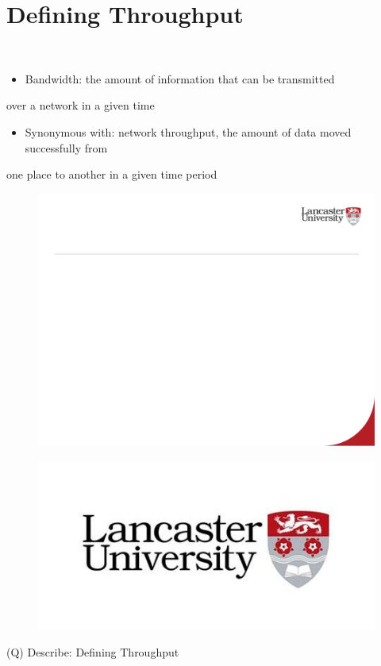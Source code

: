 \documentclass[12pt]{article}
\begin{document}
\section{Defining Throughput}
\\
\begin{itemize}
  \item Bandwidth: the amount of information that can be transmitted 
\end{itemize}
over a network in a given time\\
\begin{itemize}
  \item Synonymous with: network throughput, the amount of data moved successfully from 
\end{itemize}
one place to another in a given time period\\
\begin{figure}[H]
\includegraphics[width=0.5\linewidth]{page29-image-1.png}
\end{figure}
\begin{figure}[H]
\includegraphics[width=0.5\linewidth]{page29-image-2.png}
\end{figure}
\clearpage
(Q)
Describe: Defining Throughput
\clearpage
\end{document}
